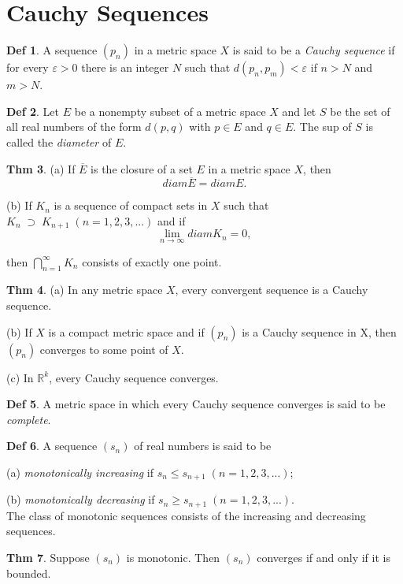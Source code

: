 \documentclass{article}
\theoremstyle{definition}
\newtheorem{definition}{Def}
\newtheorem{theorem}[definition]{Thm}
\begin{document}
\section{Cauchy Sequences}
\begin{definition}
    A sequence $(p_n)$ in a metric space $X$ is said to be a \textit{Cauchy sequence} if for every $\varepsilon>0$ there is an integer $N$ such that $d(p_n,p_m)<\varepsilon$ if $n>N$ and $m>N$.
\end{definition}
\begin{definition}
    Let $E$ be a nonempty subset of a metric space $X$ and let $S$ be the set of all real numbers of the form $d(p,q)$ with $p\in E$ and $q\in E$. The sup of $S$ is called the \textit{diameter} of $E$.
\end{definition}
\begin{theorem}
    \leavevmode\par
    (a) If $\overline{E}$ is the closure of a set $E$ in a metric space $X$, then
    \[
    diam\overline{E}=diamE.
    \]\par
    (b) If $K_n$ is a sequence of compact sets in $X$ such that $K_n\;\supset\;K_{n+1}\;(n=1,2,3,...)$ and if
    \[
    \lim_{n\to\infty} diamK_n=0,
    \]\par
    \hspace*{1em} then $\bigcap_{n=1}^\infty K_n$ consists of exactly one point.
\end{theorem}
\begin{theorem}
    \leavevmode\par
    (a) In any metric space $X$, every convergent sequence is a Cauchy sequence.\par
    (b) If $X$ is a compact metric space and if $(p_n)$ is a Cauchy sequence in X, then $(p_n)$ converges to some point of $X$.\par
    (c) In $\mathbb{R}^k$, every Cauchy sequence converges.
\end{theorem}
\begin{definition}
    A metric space in which every Cauchy sequence converges is said to be \textit{complete}.
\end{definition}
\begin{definition}
    A sequence $(s_n)$ of real numbers is said to be\par
    (a) \textit{monotonically increasing} if $s_n\leq s_{n+1}\;(n=1,2,3,...)$;\par
    (b) \textit{monotonically decreasing} if $s_n\geq s_{n+1}\;(n=1,2,3,...)$.\\
    The class of monotonic sequences consists of the increasing and decreasing sequences.
\end{definition}
\begin{theorem}
    Suppose $(s_n)$ is monotonic. Then $(s_n)$ converges if and only if it is bounded.
\end{theorem}
\end{document}
